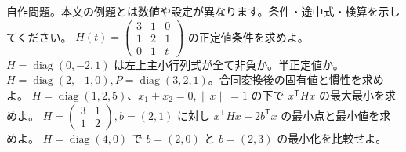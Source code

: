 \documentclass[11pt]{article}
\begin{document}
自作問題。本文の例題とは数値や設定が異なります。条件・途中式・検算を示してください。
\problem[Sylvesterの判定]
$H(t)=\begin{pmatrix}3&1&0\\1&2&1\\0&1&t\end{pmatrix}$ の正定値条件を求めよ。
\workspace{45mm}
\problem[半正定値の落とし穴]
$H=\operatorname{diag}(0,-2,1)$ は左上主小行列式が全て非負か。半正定値か。
\workspace{45mm}
\newpage
\problem[慣性]
$H=\operatorname{diag}(2,-1,0),P=\operatorname{diag}(3,2,1)$。合同変換後の固有値と慣性を求めよ。
\workspace{45mm}
\problem[制約付きRayleigh商]
$H=\operatorname{diag}(1,2,5)$、$x_1+x_2=0,\|x\|=1$ の下で $x^{\mathsf T}Hx$ の最大最小を求めよ。
\workspace{45mm}
\newpage
\problem[線形項付きの最小化]
$H=\begin{pmatrix}3&1\\1&2\end{pmatrix},b=(2,1)$ に対し $x^{\mathsf T}Hx-2b^{\mathsf T}x$ の最小点と最小値を求めよ。
\workspace{45mm}
\problem[半正定値と下に非有界]
$H=\operatorname{diag}(4,0)$ で $b=(2,0)$ と $b=(2,3)$ の最小化を比較せよ。
\workspace{45mm}
\end{document}
